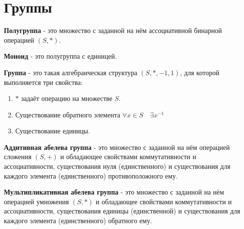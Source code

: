 \section{Группы}
\textbf{Полугруппа} - это множество с заданной на нём ассоциативной бинарной операцией $(S, *)$.

\textbf{Моноид} - это полугруппа с единицей.

\textbf{Группа} - это такая алгебраическая структура $(S, *, -1, 1)$, для которой выполняется три свойства:
\begin{enumerate}
	\item $*$ задаёт операцию на множестве $S$.
	\item Существование обратного элемента $\forall x \in S \quad \exists x^{-1}$
	\item Существование единицы.
\end{enumerate} 

\textbf{Аддитивная абелева группа} - это множество с заданной на нём операцией сложения $(S, +)$ и обладающее свойствами коммутативности и ассоциативности, существования нуля (единственного) и существования для каждого элемента (единственного) противоположного ему.

\textbf{Мультипликативная абелева группа} - это множество с заданной на нём операцией умножения $(S, *)$ и обладающее свойствами коммутативности и ассоциативности, существования единицы (единственной) и существования для каждого элемента (единственного) обратного ему.


